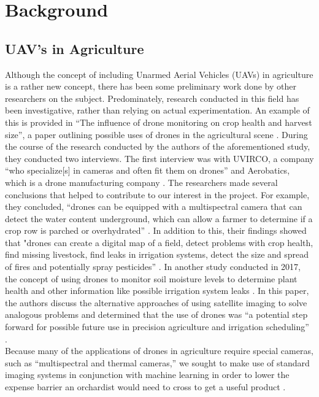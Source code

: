 \section{Background}
\subsection{UAV's in Agriculture}
Although the concept of including Unarmed Aerial Vehicles (UAVs) in agriculture is a rather new concept, there has been some preliminary work done by other researchers on the subject.
Predominately, research conducted in this field has been investigative, rather than relying on actual experimentation.
An example of this is provided in ``The influence of drone monitoring on crop health and harvest size'', a paper outlining possible uses of drones in the agricultural scene \cite{Reinecke2017}.
During the course of the research conducted by the authors of the aforementioned study, they conducted two interviews. 
The first interview was with UVIRCO, a company ``who specialize[s] in cameras and often fit them on drones'' and Aerobatics, which is a drone manufacturing company \cite{Reinecke2017}.
The researchers made several conclusions that helped to contribute to our interest in the project.
For example, they concluded, ``drones can be equipped with a multispectral camera that can detect the water content underground, which can allow a farmer to determine if a crop row is parched or overhydrated'' \cite{Reinecke2017}.
In addition to this, their findings showed that "drones can create a digital map of a field, detect problems with crop health, find missing livestock, find leaks in irrigation systems, detect the size and spread of fires and potentially spray pesticides'' \cite{Reinecke2017}.
In another study conducted in 2017, the concept of using drones to monitor soil moisture levels to determine plant health and other information like possible irrigation system leaks \cite{Hassan2017}. In this paper, the authors discuss the alternative approaches of using satellite imaging to solve analogous problems and determined that the use of drones was ``a potential step forward for possible future use in precision agriculture and irrigation scheduling'' \cite{Hassan2017}.
\\
Because many of the applications of drones in agriculture require special cameras, such as ``multispectral and thermal cameras,'' we sought to make use of standard imaging systems in conjunction with machine learning in order to lower the expense barrier an orchardist would need to cross to get a useful product \cite{Reinecke2017}.
